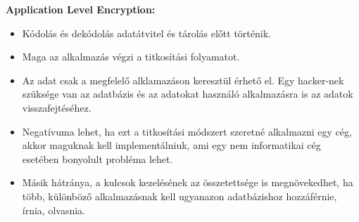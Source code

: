 \vspace{25pt}
\noindent\textbf{Application Level Encryption:} \cite{saxena2015application} \newline
\begin{itemize}
	\item Kódolás és dekódolás adatátvitel és tárolás előtt történik.
	\item Maga az alkalmazás végzi a titkosítási folyamatot.
	\item Az adat csak a megfelelő alklamazáson keresztül érhető el. Egy hacker-nek szüksége van az adatbázis és az adatokat használó alkalmazásra is az adatok visszafejtéséhez.
	\item Negatívuma lehet, ha ezt a titkosítási módszert szeretné alkalmazni egy cég, akkor maguknak kell implementálniuk, ami egy nem informatikai cég esetében bonyolult probléma lehet.
	\item Másik hátránya, a kulcsok kezelésének az összetettsége is megnövekedhet, ha több, különböző alkalmazásnak kell ugyanazon adatbázishoz hozzáférnie, írnia, olvasnia.
\end{itemize}


\newpage {}

